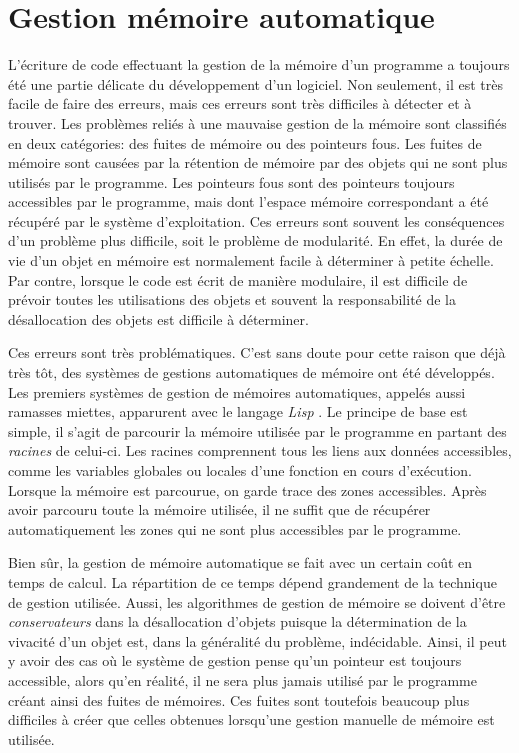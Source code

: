 \documentclass[12pt,twoside,letterpaper,francais]{book}
\newcommand{\lisp}{{\textit{Lisp }}}
\begin{document}
\FloatBarrier
\section{Gestion mémoire automatique}
L'écriture de code effectuant la gestion de la mémoire d'un programme
a toujours été une partie délicate du développement d'un logiciel. Non
seulement, il est très facile de faire des erreurs, mais ces erreurs
sont très difficiles à détecter et à trouver. Les problèmes reliés à
une mauvaise gestion de la mémoire sont classifiés en deux catégories:
des fuites de mémoire ou des pointeurs fous. Les fuites de mémoire
sont causées par la rétention de mémoire par des objets qui ne sont
plus utilisés par le programme. Les pointeurs fous sont des pointeurs
toujours accessibles par le programme, mais dont l'espace mémoire
correspondant a été récupéré par le système d'exploitation. Ces
erreurs sont souvent les conséquences d'un problème plus difficile,
soit le problème de modularité. En effet, la durée de vie d'un objet
en mémoire est normalement facile à déterminer à petite échelle. Par
contre, lorsque le code est écrit de manière modulaire, il est
difficile de prévoir toutes les utilisations des objets et souvent la
responsabilité de la désallocation des objets est difficile à
déterminer.

Ces erreurs sont très problématiques. C'est sans doute pour cette
raison que déjà très tôt, des systèmes de gestions automatiques de
mémoire ont été développés. Les premiers systèmes de gestion de
mémoires automatiques, appelés aussi ramasses miettes, apparurent avec
le langage \lisp. Le principe de base est simple, il s'agit de
parcourir la mémoire utilisée par le programme en partant des
\emph{racines} de celui-ci. Les racines comprennent tous les liens aux
données accessibles, comme les variables globales ou locales d'une
fonction en cours d'exécution. Lorsque la mémoire est parcourue, on
garde trace des zones accessibles. Après avoir parcouru toute la
mémoire utilisée, il ne suffit que de récupérer automatiquement les
zones qui ne sont plus accessibles par le programme.

Bien sûr, la gestion de mémoire automatique se fait avec un certain
coût en temps de calcul. La répartition de ce temps dépend grandement
de la technique de gestion utilisée. Aussi, les algorithmes de gestion
de mémoire se doivent d'être \emph{conservateurs} dans la
désallocation d'objets puisque la détermination de la vivacité d'un
objet est, dans la généralité du problème, indécidable. Ainsi, il peut
y avoir des cas où le système de gestion pense qu'un pointeur est
toujours accessible, alors qu'en réalité, il ne sera plus jamais
utilisé par le programme créant ainsi des fuites de mémoires. Ces
fuites sont toutefois beaucoup plus difficiles à créer que celles
obtenues lorsqu'une gestion manuelle de mémoire est utilisée.
\end{document}
